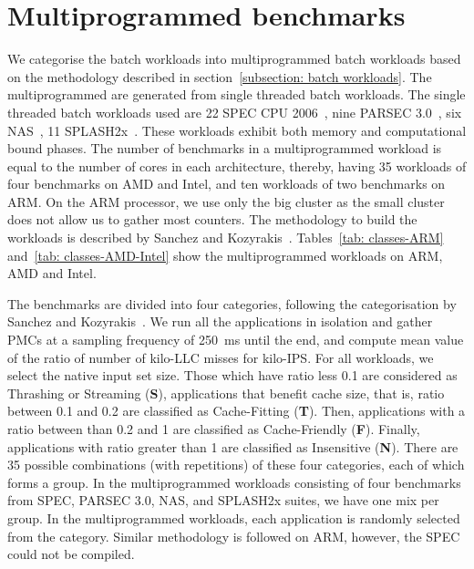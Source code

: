 \chapter{Multiprogrammed benchmarks}
\label{chap: benchmarks multi}

We categorise the batch workloads into multiprogrammed batch workloads based on the methodology described in section~\ref{subsection: batch workloads}. 
The multiprogrammed are generated from single threaded batch workloads. The single threaded
batch workloads used are 22 SPEC CPU 2006~\citep{2006core2,Henning2006SPECDescriptions},
nine PARSEC 3.0~\citep{bienia:2008:pbs:1454115.1454128}, six
NAS~\citep{Bailey:1991:NPB:125826.125925}, 11 SPLASH2x~\citep{524546}.  These workloads
exhibit both memory and computational bound phases.  The number of benchmarks in a
multiprogrammed workload is equal to the number of cores in each architecture, thereby,
having 35 workloads of four benchmarks on AMD and Intel, and ten workloads of two
benchmarks on ARM.  On the ARM processor, we use only the big cluster as the small cluster
does not allow us to gather most counters. The methodology to build the workloads is
described by Sanchez and Kozyrakis~\citep{Sanchez:2011:VSE:2000064.2000073}. 
Tables~\ref{tab: classes-ARM} and~\ref{tab: classes-AMD-Intel} show the
multiprogrammed workloads on ARM, AMD and Intel.  

\iffalse 

 The benchmarks are divided into four categories, following the
categorisation by Sanchez and Kozyrakis~\citep{Sanchez:2011:VSE:2000064.2000073}.  We run
all the applications in isolation and gather PMCs at a sampling frequency of
\SI{250}{\milli\second} until the end, and compute mean value of the ratio of number of
kilo-LLC misses for kilo-IPS. For all workloads, we select the native input set size.
Those which have  ratio less 0.1 are considered as Thrashing or Streaming (\textbf{S}),
applications that benefit cache size, that is, ratio between 0.1 and 0.2 are classified as
Cache-Fitting (\textbf{T}).  Then, applications with a ratio between than 0.2 and 1 are
classified as Cache-Friendly (\textbf{F}). Finally, applications with ratio greater than 1
are classified as Insensitive (\textbf{N}). There are 35 possible combinations (with
repetitions) of these four categories, each of which forms a group. In the multiprogrammed
workloads consisting of four benchmarks from SPEC, PARSEC 3.0, NAS, and SPLASH2x suites,
we have one mix per group.  In the multiprogrammed workloads, each application is randomly
selected from the category.  Similar methodology is followed on ARM, however, the SPEC
could not be compiled.  

